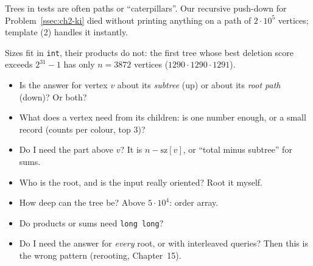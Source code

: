 \begin{warningbox}
Trees in tests are often paths or ``caterpillars''. Our recursive push-down for Problem~\ref{ssec:ch2-ki} died without printing anything on a path of $2\cdot10^5$ vertices; template (2) handles it instantly.
\end{warningbox}

\begin{warningbox}
Sizes fit in \texttt{int}, their products do not: the first tree whose best deletion score exceeds $2^{31} - 1$ has only $n = 3872$ vertices ($1290 \cdot 1290 \cdot 1291$).
\end{warningbox}

\begin{checklistbox}
\begin{itemize}[leftmargin=*]
    \item[$\square$] Is the answer for vertex $v$ about its \emph{subtree} (up) or about its \emph{root path} (down)? Or both?
    \item[$\square$] What does a vertex need from its children: is one number enough, or a small record (counts per colour, top 3)?
    \item[$\square$] Do I need the part above $v$? It is $n - \mathrm{sz}[v]$, or ``total minus subtree'' for sums.
    \item[$\square$] Who is the root, and is the input really oriented? Root it myself.
    \item[$\square$] How deep can the tree be? Above $5\cdot10^4$: order array.
    \item[$\square$] Do products or sums need \texttt{long long}?
    \item[$\square$] Do I need the answer for \emph{every} root, or with interleaved queries? Then this is the wrong pattern (rerooting, Chapter~15).
\end{itemize}
\end{checklistbox}
